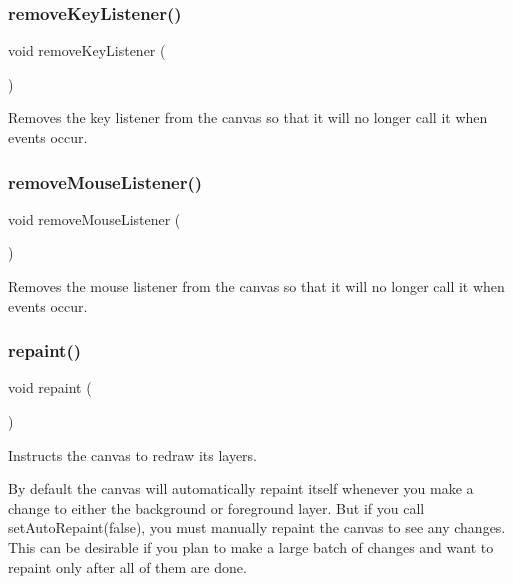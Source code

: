 \subsubsection{\texorpdfstring{remove\+Key\+Listener()}{removeKeyListener()}}
{\footnotesize\ttfamily void remove\+Key\+Listener (\begin{DoxyParamCaption}{ }\end{DoxyParamCaption})\hspace{0.3cm}{\ttfamily [virtual]}}



Removes the key listener from the canvas so that it will no longer call it when events occur. 

\mbox{\label{classGCanvas_aff47f71ce47e688a07c9d38dc92fcc11}} 
\subsubsection{\texorpdfstring{remove\+Mouse\+Listener()}{removeMouseListener()}}
{\footnotesize\ttfamily void remove\+Mouse\+Listener (\begin{DoxyParamCaption}{ }\end{DoxyParamCaption})\hspace{0.3cm}{\ttfamily [virtual]}}



Removes the mouse listener from the canvas so that it will no longer call it when events occur. 

\mbox{\label{classGCanvas_ab93427f61c64e3db7f2637519aed1c00}} 
\subsubsection{\texorpdfstring{repaint()}{repaint()}}
{\footnotesize\ttfamily void repaint (\begin{DoxyParamCaption}{ }\end{DoxyParamCaption})\hspace{0.3cm}{\ttfamily [virtual]}}



Instructs the canvas to redraw its layers. 

By default the canvas will automatically repaint itself whenever you make a change to either the background or foreground layer. But if you call set\+Auto\+Repaint(false), you must manually repaint the canvas to see any changes. This can be desirable if you plan to make a large batch of changes and want to repaint only after all of them are done. 

